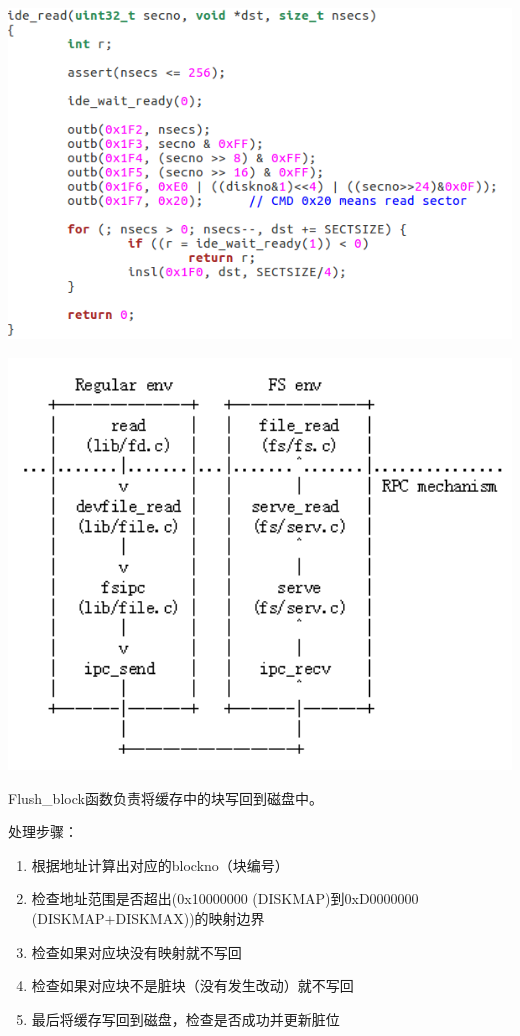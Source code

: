 \includegraphics[width=6in]{figures/file/image112.png}

\includegraphics[width=6in]{figures/file/image113.png}


Flush\_block函数负责将缓存中的块写回到磁盘中。

处理步骤：

\begin{enumerate}
\item 根据地址计算出对应的blockno（块编号）
\item 检查地址范围是否超出(0x10000000 (DISKMAP)到0xD0000000 (DISKMAP+DISKMAX))的映射边界
\item 检查如果对应块没有映射就不写回
\item 检查如果对应块不是脏块（没有发生改动）就不写回
\item 最后将缓存写回到磁盘，检查是否成功并更新脏位
\end{enumerate}

